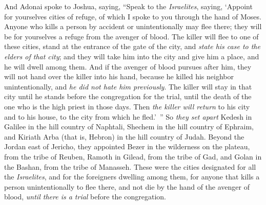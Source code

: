 \begin{biblechapter} %
 And Adonai spoke to Joshua, saying,
\verse “Speak to the \textit{Israelites}, saying, ‘Appoint for yourselves cities of refuge, of which I spoke to you through the hand of Moses.
\verse Anyone who kills a person by accident or unintentionally may flee there; they will be for yourselves a refuge from the avenger of blood.
\verse The killer will flee to one of these cities, stand at the entrance of the gate of the city, and \textit{state his case to the elders of that city}; and they will take him into the city and give him a place, and he will dwell among them.
\verse And if the avenger of blood pursues after him, they will not hand over the killer into his hand, because he killed his neighbor unintentionally, and \textit{he did not hate him previously}.
\verse The killer will stay in that city until he stands before the congregation for the trial, until the death of the one who is the high priest in those days. Then \textit{the killer will return} to his city and to his house, to the city from which he fled.’ ”
\verse So \textit{they set apart} Kedesh in Galilee in the hill country of Naphtali, Shechem in the hill country of Ephraim, and Kiriath Arba (that is, Hebron) in the hill country of Judah.
\verse Beyond the Jordan east of Jericho, they appointed Bezer in the wilderness on the plateau, from the tribe of Reuben, Ramoth in Gilead, from the tribe of Gad, and Golan in the Bashan, from the tribe of Manasseh.
\verse These were the cities designated for all the \textit{Israelites}, and for the foreigners dwelling among them, for anyone that kills a person unintentionally to flee there, and not die by the hand of the avenger of blood, \textit{until there is a trial} before the congregation.
\end{biblechapter}

